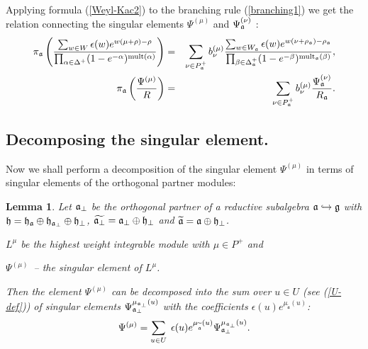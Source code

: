 \documentclass[12pt]{article}
\newtheorem{lemma}{Lemma}
\theoremstyle{definition}
\begin{document}
Applying formula (\ref{Weyl-Kac2}) to the branching rule (\ref{branching1})
we get the relation connecting the singular elements $\Psi ^{\left( \mu
\right) }$ and $\Psi _{\frak{a}}^{\left( \nu \right) }$ :
\begin{eqnarray}
\pi _{\frak{a}}\left( \frac{\sum_{w \in W}\epsilon (w )e^{w (\mu +\rho
)-\rho }}{\prod_{\alpha \in \Delta ^{+}}(1-e^{-\alpha })^{\mathrm{mult}%
(\alpha )}}\right) &=&\sum_{\nu \in P_{\frak{a}}^{+}}b_{\nu }^{(\mu )}\frac{%
\sum_{w \in W_{\frak{a}}}\epsilon (w )e^{w (\nu +\rho _{\frak{a}})-\rho _{%
\frak{a}}}}{\prod_{\beta \in \Delta _{\frak{a}}^{+}}(1-e^{-\beta })^{\mathrm{%
mult}_{\frak{a}}(\beta )}},  \notag  \label{eq:4} \\
\pi _{\frak{a}}\left( \frac{\Psi ^{\left( \mu \right) }}{R}\right)
&=&\sum_{\nu \in P_{\frak{a}}^{+}}b_{\nu }^{(\mu )}\frac{\Psi _{\frak{a}%
}^{\left( \nu \right) }}{R_{\frak{a}}}.
\end{eqnarray}

\subsection{Decomposing the singular element.}

\label{subsec:decomp-sing-element}

Now we shall perform a decomposition of the singular element $\Psi ^{\left(
\mu \right) }$ in terms of singular elements of the orthogonal partner
modules:

\begin{lemma}
Let $\frak{a}_{\bot }$ be the orthogonal partner of a reductive subalgebra $%
\frak{a}\hookrightarrow \frak{g}$ with $\frak{h}=\frak{\frak{h}_{\frak{a}}}%
\oplus \frak{h}_{\frak{a}_{\perp }}\oplus \frak{h}_{\perp }$, $\widetilde{%
\frak{a}_{\perp }}=\frak{a}_{\perp }\oplus \frak{h}_{\perp }$ and $%
\widetilde{\frak{a}}=\frak{a}\oplus \frak{h}_{\perp }$.

$L^{\mu }$ be the highest weight integrable module with $\mu \in P^{+}$ and

$\Psi ^{\left( \mu \right) }$\ -- the singular element of $L^{\mu }$.

Then the element $\Psi ^{\left( \mu \right) }$ can be decomposed into the
sum over $u\in U$ (see (\ref{U-def})) of singular elements $\Psi _{\frak{a}%
_{\perp }}^{\mu _{\frak{a}_{\perp }}\left( u\right) }$ with the coefficients
$\epsilon (u)e^{\mu _{\widetilde{\mathfrak{a}}}\left( u\right) }$:
\begin{equation}
\Psi ^{\left( \mu \right) }=\sum_{u\in U}\;\epsilon (u)e^{\mu _{\widetilde{%
\mathfrak{a}}}\left( u\right) }\Psi _{\frak{a}_{\perp }}^{\mu _{\frak{a}%
_{\perp }}\left( u\right) }.  \label{sing decomp main}
\end{equation}
\label{Psi-decomp-lemma}
\end{lemma}
\end{document}
